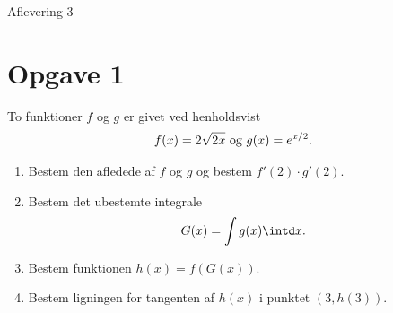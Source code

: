 
\begin{center}
\Huge
Aflevering 3
\end{center}

\section*{Opgave 1}
To funktioner $f$ og $g$ er givet ved henholdsvist
\begin{align*}
f(x) = 2\sqrt{2x} \textnormal{ og } g(x) = e^{x/2}.
\end{align*}
\begin{enumerate}[label=\roman*)]
\item Bestem den afledede af $f$ og $g$ og bestem $f'(2)\cdot g'(2)$.
\item Bestem det ubestemte integrale 
\begin{align*}
G(x) = \int g(x) \intd x.
\end{align*}
\item Bestem funktionen $h(x) = f(G(x))$.
\item Bestem ligningen for tangenten af $h(x)$ i punktet $(3,h(3))$.
\end{enumerate}

